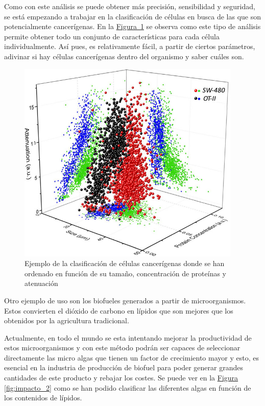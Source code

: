 \documentclass[a4paper, 12pt, UTF8]{article}
\begin{document}
Como con este análisis se puede obtener más precisión, sensibilidad y seguridad, se está empezando a trabajar en la clasificación de células en busca de las que son potencialmente cancerígenas. En la \hyperref[fig:impacto_1]{Figura~\ref{fig:impacto_1}} se observa como este tipo de análisis permite obtener todo un conjunto de características para cada célula individualmente. 
Así pues, es relativamente fácil, a partir de ciertos parámetros, adivinar si hay células cancerígenas dentro del organismo y saber cuáles son.

\begin{figure}[h!]
	\centering
	\includegraphics[width=0.95\textwidth]{impacto_1}
	\caption{Ejemplo de la clasificación de células cancerígenas donde se han ordenado en función de su tamaño, concentración de proteínas y atenuación}
	\label{fig:impacto_1}
\end{figure}

Otro ejemplo de uso son los biofueles generados a partir de microorganismos. Estos convierten el dióxido de carbono en lípidos que son mejores que los obtenidos por la agricultura tradicional. 

Actualmente, en todo el mundo se esta intentando mejorar la productividad de estos microorganismos y con este método podrán ser capaces de seleccionar directamente las micro algas que tienen un factor de crecimiento mayor y esto, es esencial en la industria de producción de biofuel para poder generar grandes cantidades de este producto y rebajar los costes. Se puede ver en la \hyperref[fig:impacto_2]{Figura \ref{fig:impacto_2}} como se han podido clasificar las diferentes algas en función de los contenidos de lípidos.
\end{document}

